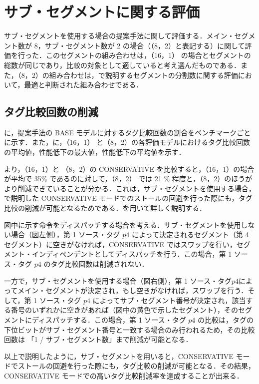 \section{サブ・セグメントに関する評価}
\label{sec:eval_subseg}
サブ・セグメントを使用する場合の提案手法に関して評価する．メイン・セグメント数が 8，サブ・セグメント数が 2 の場合（（8，2）と表記する）に関して評価を行った．このセグメントの組み合わせは，（16，1） の場合とセグメントの総数が同じであり，比較の対象として適していると考え選んだものである．また，（8，2）の組み合わせは，で説明するセグメントの分割数に関する評価において，最適と判断された組み合わせである．


\subsection{タグ比較回数の削減}
に，提案手法の BASE モデルに対するタグ比較回数の割合をベンチマークごとに示す．また，に，（16，1） と（8，2）の各評価モデルにおけるタグ比較回数の平均値，性能低下の最大値，性能低下の平均値を示す．

 より，（16，1）と （8，2）の CONSERVATIVE を比較すると，（16，1）の場合が平均で 35\% であるのに対して，（8，2） では 21 \% 程度と，（8，2）のほうがより削減できていることが分かる．これは，サブ・セグメントを使用する場合，で説明した CONSERVATIVE モードでのストールの回避を行った際にも，タグ比較の削減が可能となるためである．を用いて詳しく説明する．

図中に示す命令をディスパッチする場合を考える．サブ・セグメントを使用しない場合（図左側），第 1 ソース・タグ $p4$ によって決定されるセグメント（第 4 セグメント）に空きがなければ，CONSERVATIVE ではスワップを行い，セグメント・インディペンデントとしてディスパッチを行う．この場合，第 1 ソース・タグ $p4$ のタグ比較回数は削減されない．

一方で，サブ・セグメントを使用する場合（図右側），第 1 ソース・タグ$p4$によってメイン・セグメントが決定され，もし空きがなければ，スワップを行う．そして，第 1 ソース・タグ $p4$ によってサブ・セグメント番号が決定され，該当する番号のいずれかに空きがあれば（図中の黄色で示したセグメント），そのセグメントにディスパッチする．この場合，第 1 ソース・タグ $p4$ の比較は，タグの下位ビットがサブ・セグメント番号と一致する場合のみ行われるため，その比較回数は 「1 / サブ・セグメント数」まで削減が可能となる．

以上で説明したように，サブ・セグメントを用いると，CONSERVATIVE モードでストールの回避を行った際にも，タグ比較の削減が可能となる．その結果，CONSERVATIVE モードでの高いタグ比較削減率を達成することが出来る．

